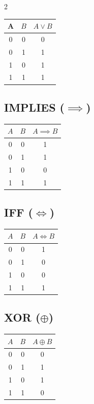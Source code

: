 \begin{multicols}{2}
	\begin{tabular}{ccc}
		\toprule
		\(\)A\(\) & \(B\) & \(A \lor B\) \\
		\midrule
		0   & 0   & 0          \\
		0   & 1   & 1          \\
		1   & 0   & 1          \\
		1   & 1   & 1          \\
		\bottomrule
	\end{tabular}

	\vspace{1em}

	\subsection*{IMPLIES (\(\implies\))}

	\begin{tabular}{ccc}
		\toprule
		\(A\) & \(B\) & \(A \implies B\) \\
		\midrule
		0   & 0   & 1        \\
		0   & 1   & 1        \\
		1   & 0   & 0        \\
		1   & 1   & 1        \\
		\bottomrule
	\end{tabular}

	\columnbreak

	\subsection*{IFF (\(\iff\))}

	\begin{tabular}{ccc}
		\toprule
		\(A\) & \(B\) & \(A \iff B\) \\
		\midrule
		0   & 0   & 1         \\
		0   & 1   & 0         \\
		1   & 0   & 0         \\
		1   & 1   & 1         \\
		\bottomrule
	\end{tabular}

	\vspace{1em}

	\subsection*{XOR (\(\oplus\))}

	\begin{tabular}{ccc}
		\toprule
		\(A\) & $B$ & $A \oplus B$ \\
		\midrule
		0   & 0   & 0            \\
		0   & 1   & 1            \\
		1   & 0   & 1            \\
		1   & 1   & 0            \\
		\bottomrule
	\end{tabular}


\end{multicols}
